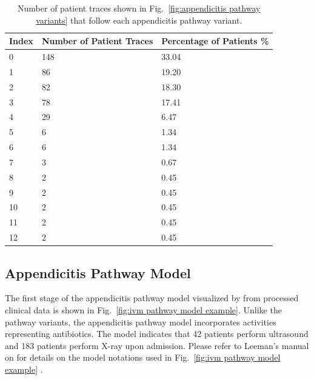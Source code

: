 \begin{table}[t]
\centering
\caption{Number of patient traces shown in Fig.~\ref{fig:appendicitis pathway variants} that follow each appendicitis pathway variant.}
\label{table:appendicitis variant table}
\begin{tabular}{ l l l }
 \hline
 \hline
 Index & Number of Patient Traces & Percentage of Patients \% \\ 
 \hline
 0 & 148 & 33.04\\ 
 1 & 86 & 19.20\\ 
 2 & 82 & 18.30\\ 
 3 & 78 & 17.41\\ 
 4 & 29 & 6.47\\ 
 5 & 6 & 1.34\\
 6 & 6 & 1.34\\ 
 7 & 3 & 0.67\\ 
 8 & 2 & 0.45\\ 
 9 & 2 & 0.45\\ 
 10 & 2 & 0.45\\ 
 11 & 2 & 0.45\\ 
 12 & 2 & 0.45\\ 
 \hline
 \hline
\end{tabular}
\end{table}

\subsection{Appendicitis Pathway Model}

The first stage of the appendicitis pathway model visualized by  from processed clinical data is shown in Fig.~\ref{fig:ivm pathway model example}. Unlike the pathway variants, the appendicitis pathway model incorporates activities representing antibiotics. The model indicates that 42 patients perform ultrasound and 183 patients perform X-ray upon admission. Please refer to Leeman's manual on  for details on the model notations used in  Fig.~\ref{fig:ivm pathway model example} \cite{leemansinductive}.

